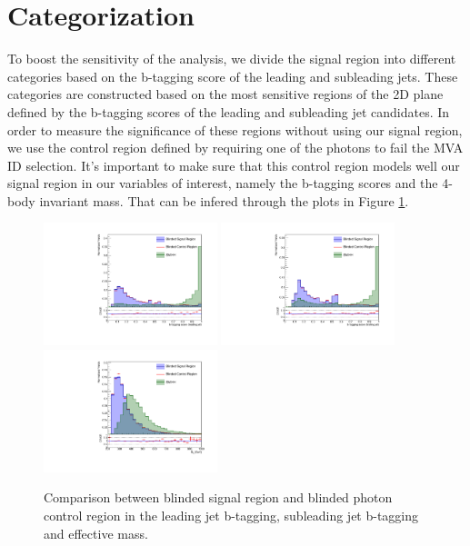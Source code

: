\section{Categorization}
\label{sec:cats}

To boost the sensitivity of the analysis, we divide the signal region into different categories based on the b-tagging score of the leading and subleading jets. 
These categories are constructed based on the most sensitive regions of the 2D plane defined by the b-tagging scores of the leading and subleading jet candidates. 
In order to measure the significance of these regions without using our signal region, we use the control region defined by requiring one of the photons to fail the MVA ID selection. 
It's important to make sure that this control region models well our signal region in our variables of interest, namely the b-tagging scores and the 4-body invariant mass. 
That can be infered through the plots in Figure \ref{fig:PCR_plots}. 

\begin{figure}[thb]
  \centering
  \includegraphics[width=0.45\textwidth]{figures/sec-cats/ljbdis}\hfil
  \includegraphics[width=0.45\textwidth]{figures/sec-cats/sjbdis}\hfil
  \includegraphics[width=0.45\textwidth]{figures/sec-cats/mx}\hfil
  \caption{Comparison between blinded signal region and blinded photon control region in the leading jet b-tagging, subleading jet b-tagging and effective mass.}
  \label{fig:PCR_plots}
\end{figure}

